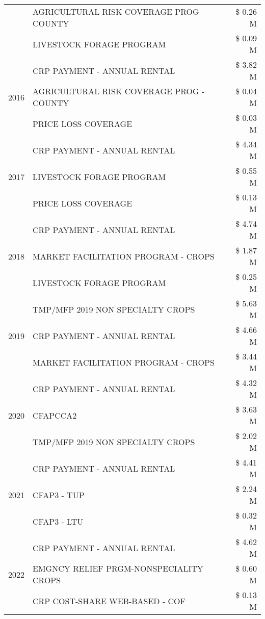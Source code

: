 \begin{tabular}{llr}
 & AGRICULTURAL RISK COVERAGE PROG - COUNTY & \$ 0.26 M \\
 & LIVESTOCK FORAGE PROGRAM & \$ 0.09 M \\
\cline{1-3}
\multirow[t]{3}{*}{2016} & CRP PAYMENT - ANNUAL RENTAL & \$ 3.82 M \\
 & AGRICULTURAL RISK COVERAGE PROG - COUNTY & \$ 0.04 M \\
 & PRICE LOSS COVERAGE & \$ 0.03 M \\
\cline{1-3}
\multirow[t]{3}{*}{2017} & CRP PAYMENT - ANNUAL RENTAL & \$ 4.34 M \\
 & LIVESTOCK FORAGE PROGRAM & \$ 0.55 M \\
 & PRICE LOSS COVERAGE & \$ 0.13 M \\
\cline{1-3}
\multirow[t]{3}{*}{2018} & CRP PAYMENT - ANNUAL RENTAL & \$ 4.74 M \\
 & MARKET FACILITATION PROGRAM - CROPS & \$ 1.87 M \\
 & LIVESTOCK FORAGE PROGRAM & \$ 0.25 M \\
\cline{1-3}
\multirow[t]{3}{*}{2019} & TMP/MFP 2019 NON SPECIALTY CROPS & \$ 5.63 M \\
 & CRP PAYMENT - ANNUAL RENTAL & \$ 4.66 M \\
 & MARKET FACILITATION PROGRAM - CROPS & \$ 3.44 M \\
\cline{1-3}
\multirow[t]{3}{*}{2020} & CRP PAYMENT - ANNUAL RENTAL & \$ 4.32 M \\
 & CFAPCCA2 & \$ 3.63 M \\
 & TMP/MFP 2019 NON SPECIALTY CROPS & \$ 2.02 M \\
\cline{1-3}
\multirow[t]{3}{*}{2021} & CRP PAYMENT - ANNUAL RENTAL & \$ 4.41 M \\
 & CFAP3 - TUP & \$ 2.24 M \\
 & CFAP3 - LTU & \$ 0.32 M \\
\cline{1-3}
\multirow[t]{3}{*}{2022} & CRP PAYMENT - ANNUAL RENTAL & \$ 4.62 M \\
 & EMGNCY RELIEF PRGM-NONSPECIALITY CROPS & \$ 0.60 M \\
 & CRP COST-SHARE WEB-BASED - COF & \$ 0.13 M \\
\cline{1-3}
\bottomrule
\end{tabular}
